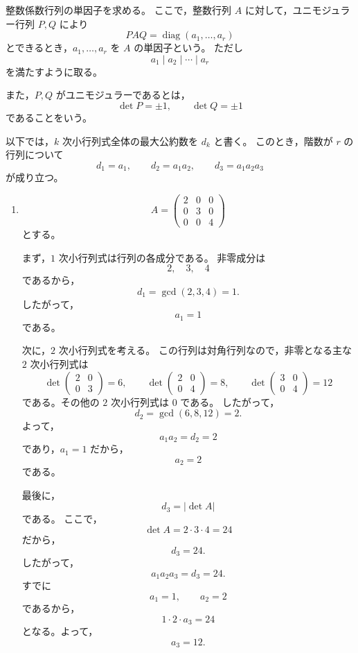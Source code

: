 
\begin{solution}
	整数係数行列の単因子を求める。
	ここで，整数行列 \(A\) に対して，ユニモジュラー行列 \(P,Q\) により
	\[
	PAQ=\operatorname{diag}(a_1,\ldots,a_r)
	\]
	とできるとき，\(a_1,\ldots,a_r\) を \(A\) の単因子という。
	ただし
	\[
	a_1\mid a_2\mid \cdots \mid a_r
	\]
	を満たすように取る。
	
	また，\(P,Q\) がユニモジュラーであるとは，
	\[
	\det P=\pm 1,
	\qquad
	\det Q=\pm 1
	\]
	であることをいう。
	
	以下では，\(k\) 次小行列式全体の最大公約数を \(d_k\) と書く。
	このとき，階数が \(r\) の行列について
	\[
	d_1=a_1,
	\qquad
	d_2=a_1a_2,
	\qquad
	d_3=a_1a_2a_3
	\]
	が成り立つ。
	
	\begin{enumerate}
		\item
		\[
		A=
		\begin{pmatrix}
			2&0&0\\
			0&3&0\\
			0&0&4
		\end{pmatrix}
		\]
		とする。
		
		まず，\(1\) 次小行列式は行列の各成分である。
		非零成分は
		\[
		2,\quad 3,\quad 4
		\]
		であるから，
		\[
		d_1=\gcd(2,3,4)=1.
		\]
		したがって，
		\[
		a_1=1
		\]
		である。
		
		次に，\(2\) 次小行列式を考える。
		この行列は対角行列なので，非零となる主な \(2\) 次小行列式は
		\[
		\det
		\begin{pmatrix}
			2&0\\
			0&3
		\end{pmatrix}
		=6,
		\qquad
		\det
		\begin{pmatrix}
			2&0\\
			0&4
		\end{pmatrix}
		=8,
		\qquad
		\det
		\begin{pmatrix}
			3&0\\
			0&4
		\end{pmatrix}
		=12
		\]
		である。その他の \(2\) 次小行列式は \(0\) である。
		したがって，
		\[
		d_2=\gcd(6,8,12)=2.
		\]
		よって，
		\[
		a_1a_2=d_2=2
		\]
		であり，\(a_1=1\) だから，
		\[
		a_2=2
		\]
		である。
		
		最後に，
		\[
		d_3=|\det A|
		\]
		である。
		ここで，
		\[
		\det A=2\cdot 3\cdot 4=24
		\]
		だから，
		\[
		d_3=24.
		\]
		したがって，
		\[
		a_1a_2a_3=d_3=24.
		\]
		すでに
		\[
		a_1=1,
		\qquad
		a_2=2
		\]
		であるから，
		\[
		1\cdot 2\cdot a_3=24
		\]
		となる。よって，
		\[
		a_3=12.
		\]
		

\end{enumerate}
\end{solution}
